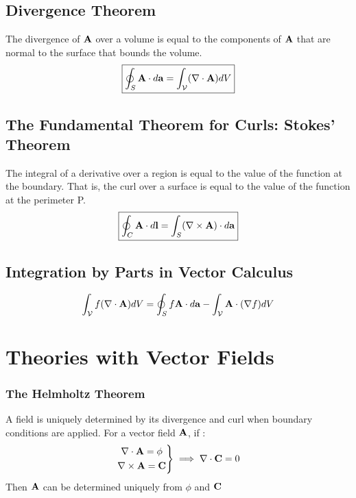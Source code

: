     \subsection*{Divergence Theorem}
        The divergence of \(\vb{A}\) over a volume is equal to the components of \(\vb{A}\) that are normal to the surface that bounds the volume. 
        \begin{align}
            \boxed{\oint_S \vb{A} \da =\int_{\mathcal{V}} (\nabla \cdot \vb{A})dV } 
        \end{align}
    \subsection*{The Fundamental Theorem for Curls: Stokes' Theorem}
        The integral of a derivative over a region is equal to the value of the function at the boundary. That is, the curl over a surface is equal to the value of the function at the perimeter P. 
        \begin{align}
            \boxed{\oint_C \vb{A} \cdot d\vb{l}=\int_{S} (\nabla \times \vb{A}) \cdot d\vb{a}} 
        \end{align}
        \subsection*{Integration by Parts in Vector Calculus}
        \begin{align*}
        \int_{\mathcal{V}} f(\nabla \cdot \vb{A})dV = \oint_S f\vb{A}\da-\int_{\mathcal{V}} \vb{A} \cdot (\nabla f)dV 
        \end{align*}


        \newpage


\section{Theories with Vector Fields \label{vectorfields}}
    \subsubsection*{The Helmholtz Theorem}
        A field is uniquely determined by its divergence and curl when boundary conditions are applied. For a vector field \(\vb{A}\), if :
        \begin{align*}
            \left.
            \begin{gathered}
            \nabla \cdot \vb{A}= \phi
            \\
            \nabla \times \vb{A}= \vb{C}
            \end{gathered}
            \right\}
            \implies
            \nabla \cdot \vb{C} = 0
        \end{align*}
        Then \(\vb{A}\) can be determined uniquely from $\phi$ and $\vb{C}$
